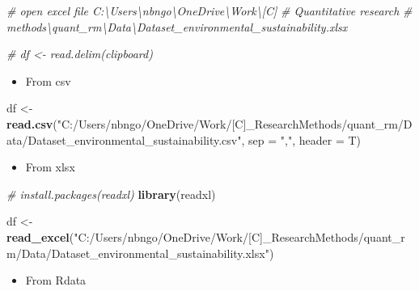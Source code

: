 \documentclass[
  a4paper,
]{article}
\newenvironment{Shaded}{\begin{snugshade}}{\end{snugshade}}
\newcommand{\AttributeTok}[1]{\textcolor[rgb]{0.13,0.29,0.53}{#1}}
\newcommand{\CommentTok}[1]{\textcolor[rgb]{0.56,0.35,0.01}{\textit{#1}}}
\newcommand{\FunctionTok}[1]{\textcolor[rgb]{0.13,0.29,0.53}{\textbf{#1}}}
\newcommand{\NormalTok}[1]{#1}
\newcommand{\OtherTok}[1]{\textcolor[rgb]{0.56,0.35,0.01}{#1}}
\newcommand{\StringTok}[1]{\textcolor[rgb]{0.31,0.60,0.02}{#1}}
\providecommand{\tightlist}{%
  \setlength{\itemsep}{0pt}\setlength{\parskip}{0pt}}
\begin{document}
\begin{Shaded}
\begin{Highlighting}[]
\CommentTok{\# open excel file \textquotesingle{}C:\textbackslash{}Users\textbackslash{}nbngo\textbackslash{}OneDrive\textbackslash{}Work\textbackslash{}[C]}
\CommentTok{\# Quantitative research}
\CommentTok{\# methods\textbackslash{}quant\_rm\textbackslash{}Data\textbackslash{}Dataset\_environmental\_sustainability.xlsx\textquotesingle{}}

\CommentTok{\# df \textless{}{-} read.delim(\textquotesingle{}clipboard\textquotesingle{})}
\end{Highlighting}
\end{Shaded}

\begin{itemize}
\tightlist
\item
  From csv
\end{itemize}

\begin{Shaded}
\begin{Highlighting}[]
\NormalTok{df }\OtherTok{\textless{}{-}} \FunctionTok{read.csv}\NormalTok{(}\StringTok{"C:/Users/nbngo/OneDrive/Work/[C]\_ResearchMethods/quant\_rm/Data/Dataset\_environmental\_sustainability.csv"}\NormalTok{,}
    \AttributeTok{sep =} \StringTok{","}\NormalTok{, }\AttributeTok{header =}\NormalTok{ T)}
\end{Highlighting}
\end{Shaded}

\begin{itemize}
\tightlist
\item
  From xlsx
\end{itemize}

\begin{Shaded}
\begin{Highlighting}[]
\CommentTok{\# install.packages(\textquotesingle{}readxl\textquotesingle{})}
\FunctionTok{library}\NormalTok{(readxl)}

\NormalTok{df }\OtherTok{\textless{}{-}} \FunctionTok{read\_excel}\NormalTok{(}\StringTok{"C:/Users/nbngo/OneDrive/Work/[C]\_ResearchMethods/quant\_rm/Data/Dataset\_environmental\_sustainability.xlsx"}\NormalTok{)}
\end{Highlighting}
\end{Shaded}

\begin{itemize}
\tightlist
\item
  From Rdata
\end{itemize}
\end{document}
